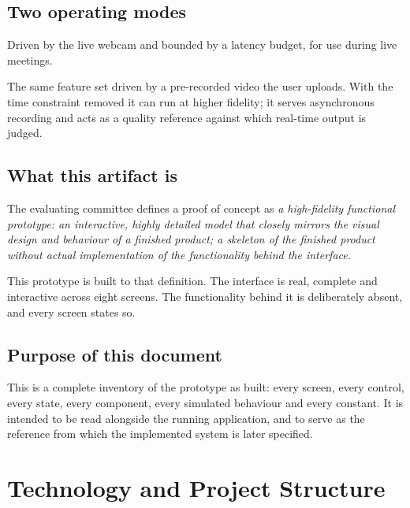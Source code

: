 \documentclass[11pt,a4paper]{report}
\begin{document}
\section{Two operating modes}

\begin{description}[leftmargin=0pt,style=nextline]
  \item[Real-time mode (primary).] Driven by the live webcam and bounded by a
    latency budget, for use during live meetings.
  \item[Offline mode.] The same feature set driven by a pre-recorded video the
    user uploads. With the time constraint removed it can run at higher
    fidelity; it serves asynchronous recording and acts as a quality reference
    against which real-time output is judged.
\end{description}

\section{What this artifact is}

The evaluating committee defines a proof of concept as \emph{a high-fidelity
functional prototype: an interactive, highly detailed model that closely
mirrors the visual design and behaviour of a finished product; a skeleton of
the finished product without actual implementation of the functionality behind
the interface.}

This prototype is built to that definition. The interface is real, complete and
interactive across eight screens. The functionality behind it is deliberately
absent, and every screen states so.

\section{Purpose of this document}

This is a complete inventory of the prototype as built: every screen, every
control, every state, every component, every simulated behaviour and every
constant. It is intended to be read alongside the running application, and to
serve as the reference from which the implemented system is later specified.

\chapter{Technology and Project Structure}
\end{document}
